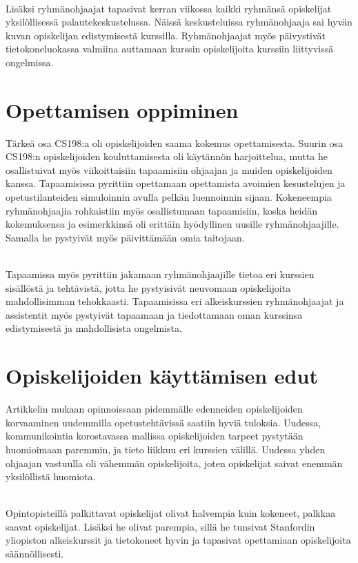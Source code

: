 \documentclass[finnish]{tktltiki2}
\theoremstyle{definition}
\theoremstyle{remark}
\begin{document}
\\

Lisäksi ryhmänohjaajat tapasivat kerran viikossa kaikki ryhmänsä opiskelijat yksilöllisessä palautekeskustelussa. Näissä keskusteluissa ryhmänohjaaja sai hyvän kuvan opiskelijan edistymisestä kurssilla. Ryhmänohjaajat myös päivystivät tietokoneluokassa valmiina auttamaan kurssin opiskelijoita kurssiin liittyvissä ongelmissa.





\section{Opettamisen oppiminen}

Tärkeä osa CS198:a oli opiskelijoiden saama kokemus opettamisesta. Suurin osa CS198:n opiskelijoiden kouluttamisesta oli käytännön harjoittelua, mutta he osallistuivat myös viikoittaisiin tapaamisiin ohjaajan ja muiden opiskelijoiden kanssa. Tapaamisissa pyrittiin opettamaan opettamista avoimien kesustelujen ja opetustilanteiden simuloinnin avulla pelkän luennoinnin sijaan. Kokeneempia ryhmänohjaajia rohkaistiin myös osallistumaan tapaamisiin, koska heidän kokemuksensa ja esimerkkinsä oli erittäin hyödyllinen uusille ryhmänohjaajille. Samalla he pystyivät myös päivittämään omia taitojaan. 

\\

Tapaamissa myös pyrittiin jakamaan ryhmänohjaajille tietoa eri kurssien sisällöstä ja tehtävistä, jotta he pystyisivät neuvomaan opiskelijoita mahdollisimman tehokkaasti. Tapaamisissa eri alkeiskurssien ryhmänohjaajat ja assistentit myös pystyivät tapaamaan ja tiedottamaan oman kurssinsa edistymisestä ja mahdollisista ongelmista.


\section{Opiskelijoiden käyttämisen edut}

Artikkelin mukaan opinnoissaan pidemmälle edenneiden opiskelijoiden korvaaminen uudemmilla opetustehtävissä saatiin hyviä tuloksia. Uudessa, kommunikointia korostavassa mallissa opiskelijoiden tarpeet pystytään huomioimaan paremmin, ja tieto liikkuu eri kurssien välillä. Uudessa yhden ohjaajan vastuulla oli vähemmän opiskelijoita, joten opiskelijat saivat enemmän yksilöllistä huomiota.

\\

Opintopisteillä palkittavat opiskelijat olivat halvempia kuin kokeneet, palkkaa saavat opiskelijat. Lisäksi he olivat parempia, sillä he tunsivat Stanfordin yliopiston alkeiskurssit ja tietokoneet hyvin ja tapasivat opettamiaan opiskelijoita säännöllisesti.






\end{document}
